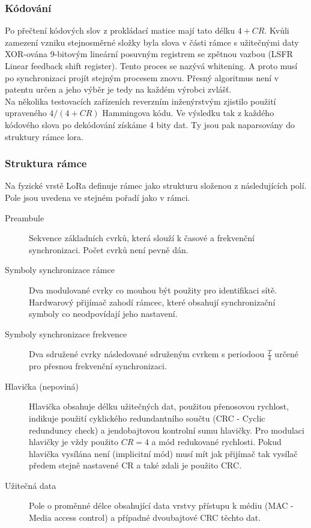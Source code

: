 \documentclass{ctuthesis}
\begin{document}
\subsubsection{Kódování}
Po přečtení kódových slov z prokládací matice mají tato délku $4 + CR$. Kvůli zamezení vzniku stejnosměrné složky byla slova v části rámce s užitečnými daty XOR-ována 9-bitovým lineární posuvným registrem se zpětnou vazbou (LSFR Linear feedback shift register). Tento proces se nazývá whitening. A proto musí po synchronizaci projít stejným procesem znovu. Přesný algoritmus není v patentu určen a jeho výběr je tedy na každém výrobci zvlášť. \\
Na několika testovacích zařízeních \cite{gr-lora2018} reverzním inženýrstvým zjistilo použití upraveného $4/(4 + CR)$ Hammingova kódu. Ve výsledku tak z každého kódového slova po dekódování získáme 4 bity dat. Ty jsou pak naparsovány do struktury rámce lora.

\subsubsection{Struktura rámce}
Na fyzické vrstě LoRa definuje rámec jako strukturu složenou z následujících polí. Pole jsou uvedena ve stejném pořadí jako v rámci.
\begin{description}
\item[Preambule]
Sekvence základních cvrků, která slouží k časové a frekvenční synchronizaci. Počet cvrků není pevně dán.
\item[Symboly synchronizace rámce]
Dva modulované cvrky co mouhou být použity pro identifikaci sítě. Hardwarový přijímač zahodí rámcec, které obsahují synchronizační symboly co neodpovídají jeho nastavení.
\item[Symboly synchronizace frekvence]
Dva sdružené cvrky následované sdruženým cvrkem s periodoou $\frac{T}{4}$ určené pro přesnou frekvenční synchronizaci.
\item[Hlavička (nepoviná)]
Hlavička obsahuje délku užitečných dat, použitou přenosovou rychlost, indikuje použití cyklického redundantního součtu (CRC - Cyclic redunduncy check) a jendobajtovou kontrolní sumu hlavičky. Pro modulaci hlavičky je vždy použito $CR =4$ a mód redukované rychlosti. Pokud hlavička vysílána není (implicitní mód) musí mít jak přijímač tak vysílač předem stejně nastavené CR a také zdali je použito CRC.
\item[Užitečná data]
Pole o proměnné délce obsahující data vrstvy přístupu k médiu (MAC - Media access control) a případné dvoubajtové CRC těchto dat.
\end{description}
\end{document}

